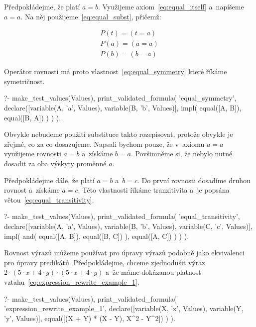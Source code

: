 Předpokládejme, že platí \(a = b\). Využijeme axiom~\eqref{eq:equal_itself} a~napíšeme \(a = a\). Na něj použijeme~\eqref{eq:equal_subst}, přičemž:

\begin{equation}
\begin{split}
P(t) = (t = a) \\
P(a) = (a = a) \\
P(b) = (b = a)
\end{split}
\end{equation}

Operátor rovnosti má proto vlastnost~\eqref{eq:equal_symmetry} které říkáme symetričnost.

\begin{fact}
\begin{prolog}
?- 	make_test_values(Values),
	print_validated_formula(
		'equal_symmetry',
		declare([variable(A, 'a', Values), variable(B, 'b', Values)],
			impl(
				equal([A, B]),
				equal([B, A])
			)
		)
	).
\end{prolog}
\end{fact}

Obvykle nebudeme použití substituce takto rozepisovat, protože obvykle je zřejmé, co za co dosazujeme. Napsali bychom pouze, že v~axiomu \(a = a\) využijeme rovnosti \(a = b\) a~získáme \(b = a\). Povšimněme si, že nebylo nutné dosadit za oba výskyty proměnné \(a\).

Předpokládejme dále, že platí \(a = b\) a~\(b = c\). Do první rovnosti dosadíme druhou rovnost a~získáme \(a = c\). Této vlastnosti říkáme tranzitivita a~je popsána větou~\eqref{eq:equal_transitivity}.

\begin{fact}
\begin{prolog}
?- 	make_test_values(Values),
	print_validated_formula(
		'equal_transitivity',
		declare([variable(A, 'a', Values), variable(B, 'b', Values), variable(C, 'c', Values)],
			impl(
				and(
					equal([A, B]),
					equal([B, C])
				),
				equal([A, C])
			)
		)
	).
\end{prolog}
\end{fact}

Rovnost výrazů můžeme používat pro úpravy výrazů podobně jako ekvivalenci pro úpravy predikátů. Předpokládejme, chceme zjednodušit výraz \(2 \cdot (5 \cdot x + 4 \cdot y) \cdot (5 \cdot x + 4 \cdot y)\) a~že máme dokázanou platnost vztahu~\eqref{eq:expression_rewrite_example_1}.

\begin{prolog}
?- 	make_test_values(Values),
	print_validated_formula(
		'expression_rewrite_example_1',
		declare([variable(X, 'x', Values), variable(Y, 'y', Values)],
			equal([(X + Y) * (X - Y), X^2 - Y^2])
		)
	).
\end{prolog}

